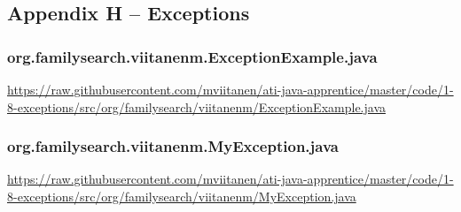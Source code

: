 \subsection*{Appendix H -- Exceptions} \label{App:AppendixH}

\subsubsection*{org.familysearch.viitanenm.ExceptionExample.java}
\noindent
\begin{minipage}{.6in}
\end{minipage}
\begin{minipage}{6in}
  \url{https://raw.githubusercontent.com/mviitanen/ati-java-apprentice/master/code/1-8-exceptions/src/org/familysearch/viitanenm/ExceptionExample.java}
\end{minipage}

\vspace{1em}
\subsubsection*{org.familysearch.viitanenm.MyException.java}
\noindent
\begin{minipage}{.6in}
\end{minipage}
\begin{minipage}{6in}
  \url{https://raw.githubusercontent.com/mviitanen/ati-java-apprentice/master/code/1-8-exceptions/src/org/familysearch/viitanenm/MyException.java}
\end{minipage}
